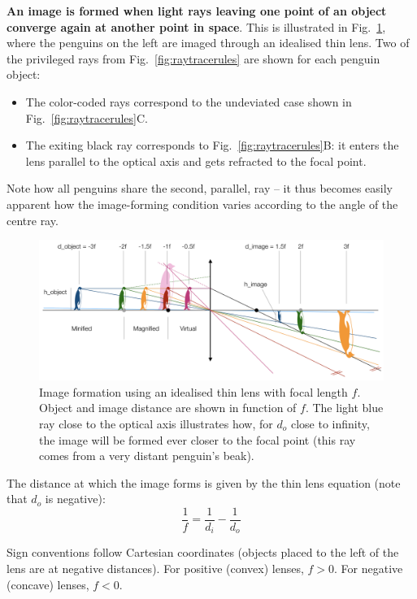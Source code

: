 \documentclass[a4paper]{report}
\begin{document}
	\textbf{An image is formed when light rays leaving one point of an object converge again at another point in space}.
	This is illustrated in Fig.~\ref{fig:imageforming}, where the penguins on the left are imaged through an idealised thin lens.
	Two of the privileged rays from Fig.~\ref{fig:raytracerules} are shown for each penguin object:
	\begin{itemize}
	\item The color-coded rays correspond to the undeviated case shown in Fig.~\ref{fig:raytracerules}C.
	\item The exiting black ray corresponds to Fig.~\ref{fig:raytracerules}B: it enters the lens parallel to the optical axis and gets refracted to the focal point.
	\end{itemize}
	Note how all penguins share the second, parallel, ray -- it thus becomes easily apparent how the image-forming condition varies according to the angle of the centre ray.

	\begin{figure}[h]
		\center
		\includegraphics[width=1\textwidth]{figures/penguin_lens.png}
		\captionsetup{width=0.95\textwidth}
		\caption{Image formation using an idealised thin lens with focal length $f$. Object and image distance are shown in function of $f$.
		The light blue ray close to the optical axis illustrates how, for $d_o$ close to infinity, the image will be formed ever closer to the focal point (this ray comes from a very distant penguin's beak).
		}
		\label{fig:imageforming}
	\end{figure}

	\noindent
	   The distance at which the image forms is given by the thin lens equation (note that $d_o$ is negative):
	\begin{equation}
	\frac{1}{f} = \frac{1}{d_i} - \frac{1}{d_o}
	\label{eq:thinlens}
	\end{equation}

	Sign conventions follow Cartesian coordinates (objects placed to the left of the lens are at negative distances). For positive (convex) lenses, $f>0$. For negative (concave) lenses, $f<0$.
\end{document}
